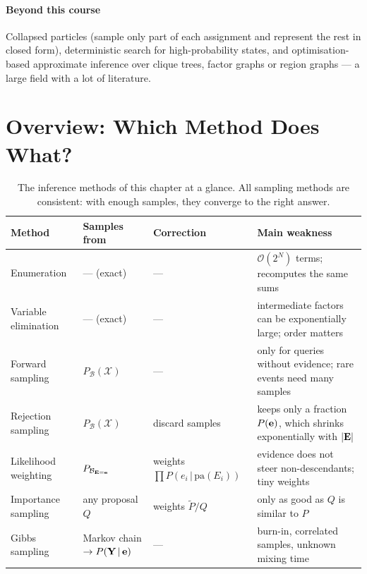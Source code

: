 \documentclass[11pt, oneside]{book}
\newcommand{\Prob}{\mathbb{P}}           %
\newcommand{\given}{\,\vert\,}           %
\newcommand{\pa}{\mathrm{pa}}            %
\newcommand{\Xall}{\mathcal{X}}          %
\let\originalsection\section
\renewcommand{\section}{\Needspace{7\baselineskip}\originalsection}
\begin{document}
\paragraph{Beyond this course} Collapsed particles (sample only part of each
assignment and represent the rest in closed form), deterministic search for
high-probability states, and optimisation-based approximate inference over
clique trees, factor graphs or region graphs --- a large field with a lot of
literature.

\section{Overview: Which Method Does What?}

\begin{table}[htbp]
\centering
\small
\renewcommand{\arraystretch}{1.3}
\begin{tabular}{@{}>{\raggedright\arraybackslash}p{2.7cm}>{\raggedright\arraybackslash}p{3.3cm}>{\raggedright\arraybackslash}p{2.9cm}>{\raggedright\arraybackslash}p{5.4cm}@{}}
\toprule
\textbf{Method} & \textbf{Samples from} & \textbf{Correction} & \textbf{Main weakness} \\
\midrule
Enumeration & --- (exact) & --- & $\mathcal{O}(2^N)$ terms; recomputes the same sums \\
Variable elimination & --- (exact) & --- & intermediate factors can be exponentially large; order matters \\
\midrule
Forward sampling & $P_{\mathcal{B}}(\Xall)$ & --- & only for queries without evidence; rare events need many samples \\
Rejection sampling & $P_{\mathcal{B}}(\Xall)$ & discard samples & keeps only a fraction $P(\mathbf{e})$, which shrinks exponentially with $|\mathbf{E}|$ \\
Likelihood weighting & $P_{\mathcal{B}_{\mathbf{E} = \mathbf{e}}}$ & weights $\prod P(e_i \given \pa(E_i))$ & evidence does not steer non-descendants; tiny weights \\
Importance sampling & any proposal $Q$ & weights $\tilde P/Q$ & only as good as $Q$ is similar to $P$ \\
Gibbs sampling & Markov chain $\to P(\bY \given \be)$ & --- & burn-in, correlated samples, unknown mixing time \\
\bottomrule
\end{tabular}
\caption{The inference methods of this chapter at a glance. All sampling
methods are consistent: with enough samples, they converge to the right
answer.}
\label{tab:inference-overview}
\end{table}
\end{document}
